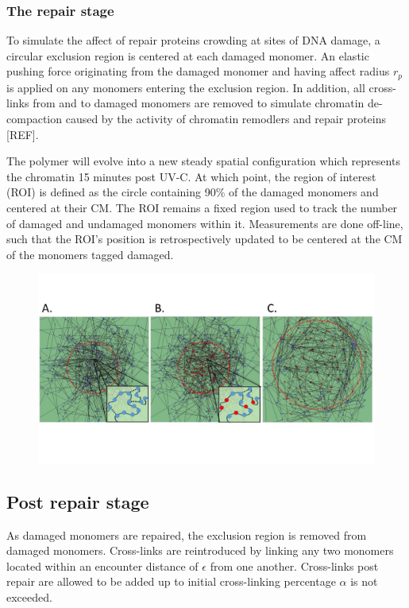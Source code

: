 \documentclass[12pt]{article}
\begin{document}
	\subsubsection{The repair stage}	
	To simulate the affect of repair proteins crowding at sites of DNA damage, a circular exclusion region is centered at each damaged monomer. An elastic pushing force originating from the damaged monomer and having affect radius $r_p$ is applied on any monomers entering the exclusion region. In addition, all cross-links from and to damaged monomers are removed to simulate chromatin de-compaction caused by the activity of chromatin remodlers and repair proteins [REF]. 
	
	The polymer will evolve into a new steady spatial configuration which represents the chromatin 15 minutes post UV-C. At which point, the region of interest (ROI) is defined as the circle containing 90\% of the damaged monomers and centered at their CM. The ROI remains a fixed region used to track the number of damaged and undamaged monomers within it. Measurements are done off-line, such that the ROI's position is retrospectively updated to be centered at the CM of the monomers tagged damaged.
	
\begin{figure}

\includegraphics[width=0.9\linewidth, height=0.35\textheight]{threeStagesOfSimulation}
\caption{}
\label{fig:threeStagesOfSimulation}
\end{figure}
	\subsection{Post repair stage}
	
	As damaged monomers are repaired, the exclusion region is removed from damaged monomers. Cross-links are reintroduced by linking any two monomers located within an encounter distance of $\epsilon$ from one another. Cross-links post repair are allowed to be added up to initial cross-linking percentage $\alpha$ is not exceeded.
	
\end{document}
